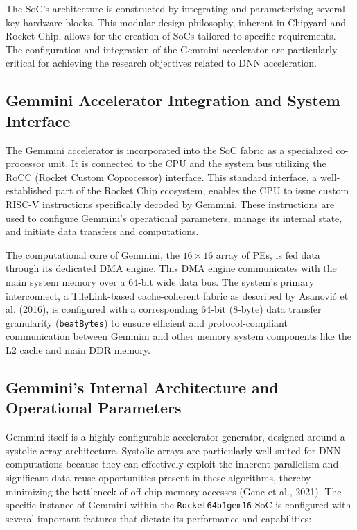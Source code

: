 The SoC's architecture is constructed by integrating and parameterizing several key hardware blocks. This modular design philosophy, inherent in Chipyard and Rocket Chip, allows for the creation of SoCs tailored to specific requirements. The configuration and integration of the Gemmini accelerator are particularly critical for achieving the research objectives related to DNN acceleration.

\subsection{Gemmini Accelerator Integration and System Interface}
\label{sec:gemmini_integration}

The Gemmini accelerator is incorporated into the SoC fabric as a specialized co-processor unit. It is connected to the CPU and the system bus utilizing the RoCC (Rocket Custom Coprocessor) interface. This standard interface, a well-established part of the Rocket Chip ecosystem, enables the CPU to issue custom RISC-V instructions specifically decoded by Gemmini. These instructions are used to configure Gemmini's operational parameters, manage its internal state, and initiate data transfers and computations.

The computational core of Gemmini, the $16 \times 16$ array of PEs, is fed data through its dedicated DMA engine. This DMA engine communicates with the main system memory over a 64-bit wide data bus. The system's primary interconnect, a TileLink-based cache-coherent fabric as described by Asanović et al. (2016), is configured with a corresponding 64-bit (8-byte) data transfer granularity (\texttt{beatBytes}) to ensure efficient and protocol-compliant communication between Gemmini and other memory system components like the L2 cache and main DDR memory.

\subsection{Gemmini's Internal Architecture and Operational Parameters}
\label{sec:gemmini_architecture}

Gemmini itself is a highly configurable accelerator generator, designed around a systolic array architecture. Systolic arrays are particularly well-suited for DNN computations because they can effectively exploit the inherent parallelism and significant data reuse opportunities present in these algorithms, thereby minimizing the bottleneck of off-chip memory accesses (Genc et al., 2021). The specific instance of Gemmini within the \texttt{Rocket64b1gem16} SoC is configured with several important features that dictate its performance and capabilities:

